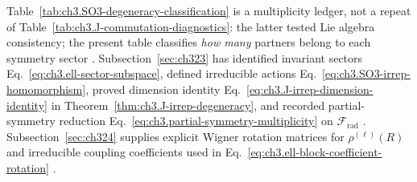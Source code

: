 Table~\ref{tab:ch3.SO3-degeneracy-classification} is a multiplicity ledger, not a repeat of
Table~\ref{tab:ch3.J-commutation-diagnostics}: the latter tested Lie algebra consistency; the present
table classifies \emph{how many} partners belong to each symmetry sector \cite{stratton1941}.
Subsection~\ref{sec:ch323} has identified invariant sectors
Eq.~\eqref{eq:ch3.ell-sector-subspace}, defined irreducible actions
Eq.~\eqref{eq:ch3.SO3-irrep-homomorphism}, proved dimension identity
Eq.~\eqref{eq:ch3.J-irrep-dimension-identity} in Theorem~\ref{thm:ch3.J-irrep-degeneracy}, and recorded
partial-symmetry reduction Eq.~\eqref{eq:ch3.partial-symmetry-multiplicity} on \(\mathcal{F}_{\mathrm{rad}}\)
\cite{jackson1999}. Subsection~\ref{sec:ch324} supplies explicit
Wigner rotation matrices for \(\rho^{(\ell)}(R)\) and irreducible coupling coefficients used in
Eq.~\eqref{eq:ch3.ell-block-coefficient-rotation} \cite{jackson1999}.
